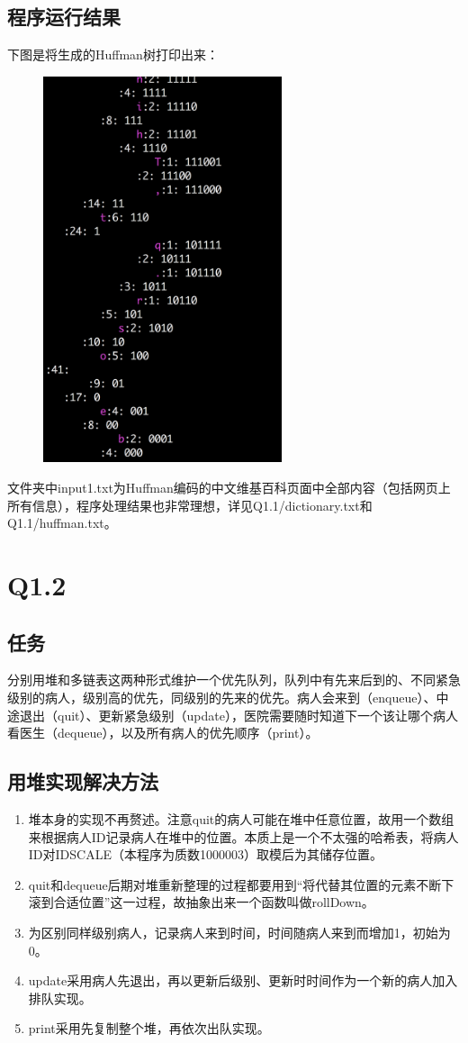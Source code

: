 \documentclass{homework}
\begin{document}
\subsection{程序运行结果}
下图是将生成的Huffman树打印出来：
\begin{figure}[H]
    \centering
    \includegraphics[width=7cm]{Q1.1/tree.png}
\end{figure}
文件夹中input1.txt为Huffman编码的中文维基百科页面中全部内容（包括网页上所有信息），程序处理结果也非常理想，详见Q1.1/dictionary.txt和Q1.1/huffman.txt。
\section{Q1.2}
\subsection{任务}
分别用堆和多链表这两种形式维护一个优先队列，队列中有先来后到的、不同紧急级别的病人，级别高的优先，同级别的先来的优先。病人会来到（enqueue）、中途退出（quit）、更新紧急级别（update），医院需要随时知道下一个该让哪个病人看医生（dequeue），以及所有病人的优先顺序（print）。
\subsection{用堆实现解决方法}
\begin{enumerate}
    \item 堆本身的实现不再赘述。注意quit的病人可能在堆中任意位置，故用一个数组来根据病人ID记录病人在堆中的位置。本质上是一个不太强的哈希表，将病人ID对IDSCALE（本程序为质数1000003）取模后为其储存位置。
    \item quit和dequeue后期对堆重新整理的过程都要用到“将代替其位置的元素不断下滚到合适位置”这一过程，故抽象出来一个函数叫做rollDown。
    \item 为区别同样级别病人，记录病人来到时间，时间随病人来到而增加1，初始为0。
    \item update采用病人先退出，再以更新后级别、更新时时间作为一个新的病人加入排队实现。
    \item print采用先复制整个堆，再依次出队实现。
\end{enumerate}
\end{document}
